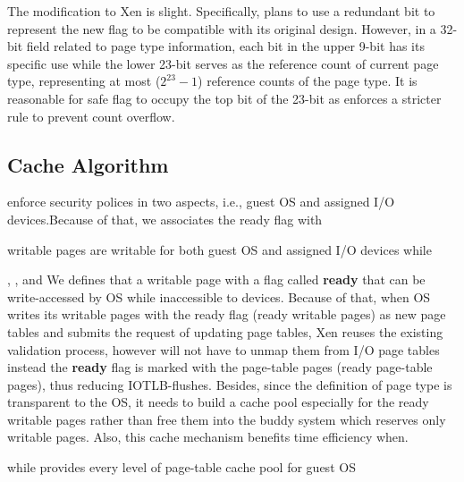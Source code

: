 The modification to Xen is slight. Specifically, \name plans to use a redundant bit to represent the new flag to be compatible with its original design. However, in a 32-bit field related to page type information, each bit in the upper 9-bit has its specific use while the lower 23-bit serves as the reference count of current page type, representing at most ($2^23-1$) reference counts of the page type. It is reasonable for safe flag to occupy the top bit of the 23-bit as \name enforces a stricter rule to prevent count overflow.

\subsection{Cache Algorithm}



enforce security polices in two aspects, i.e., guest OS and assigned I/O devices.Because of that, we associates the ready flag with

writable pages are writable for both guest OS and assigned I/O devices while

, , and  We defines that a writable page with a flag called \textbf{ready} that can be write-accessed by OS while inaccessible to devices. Because of that, when OS writes its writable pages with the ready flag (ready writable pages) as new page tables and submits the request of updating page tables, Xen reuses the existing validation process, however will not have to unmap them from I/O page tables instead the \textbf{ready} flag is marked with the page-table pages (ready page-table pages), thus reducing IOTLB-flushes. Besides, since the definition of page type is transparent to the OS, it needs to build a cache pool especially for the ready writable pages rather than free them into the buddy system which reserves only writable pages. Also, this cache mechanism benefits time efficiency when.

while provides every level of page-table cache pool for guest OS
